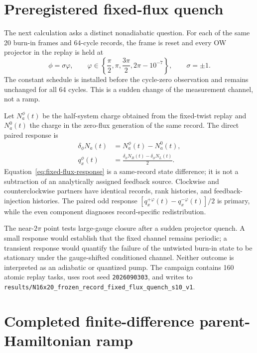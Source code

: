 \documentclass[aps,prb,twocolumn,floatfix,nofootinbib,superscriptaddress]{revtex4-2}
\newcommand{\code}[1]{\texttt{#1}}
\begin{document}
\section{Preregistered fixed-flux quench}

The next calculation asks a distinct nonadiabatic question.  For each of the
same 20 burn-in frames and 64-cycle records, the frame is reset and every OW
projector in the replay is held at
\begin{equation}
 \phi=\sigma\varphi,\qquad
 \varphi\in\left\{\frac{\pi}{2},\pi,\frac{3\pi}{2},
 2\pi-10^{-7}\right\},\qquad \sigma=\pm1.
 \label{eq:fixed-flux-grid}
\end{equation}
The constant schedule is installed before the cycle-zero observation and
remains unchanged for all 64 cycles.  This is a sudden change of the
measurement channel, not a ramp.

Let $N_a^{\phi}(t)$ be the half-system charge obtained from the fixed-twist
replay and $N_a^0(t)$ the charge in the zero-flux generation of the same
record.  The direct paired response is
\begin{align}
 \delta_\phi N_a(t)&=N_a^{\phi}(t)-N_a^0(t),\\
 q_x^{\phi}(t)&=\frac{\delta_\phi N_R(t)-\delta_\phi N_L(t)}{2}.
 \label{eq:fixed-flux-response}
\end{align}
Equation~\eqref{eq:fixed-flux-response} is a same-record state difference; it
is not a subtraction of an analytically assigned feedback source.  Clockwise
and counterclockwise partners have identical records, rank histories, and
feedback-injection histories.  The paired odd response
$[q_x^{+\varphi}(t)-q_x^{-\varphi}(t)]/2$ is primary, while the even component
diagnoses record-specific redistribution.

The near-$2\pi$ point tests large-gauge closure after a sudden projector
quench.  A small response would establish that the fixed channel remains
periodic; a transient response would quantify the failure of the untwisted
burn-in state to be stationary under the gauge-shifted conditioned channel.
Neither outcome is interpreted as an adiabatic or quantized pump.  The
campaign contains 160 atomic replay tasks, uses root seed
\code{2026090303}, and writes to
\code{results/N16x20\_frozen\_record\_fixed\_flux\_quench\_s10\_v1}.

\section{Completed finite-difference parent-Hamiltonian ramp}
\end{document}
